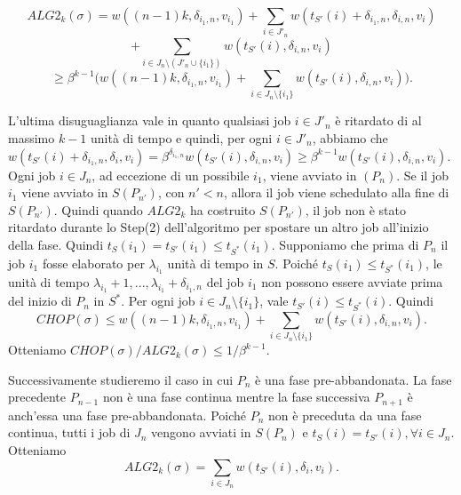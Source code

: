 \documentclass[12pt]{article}
\begin{document}
$$ALG2_{k}(\sigma ) = w((n - 1)k, \delta_{i_{1} ,n}, v_{i_{1}}) + \sum_{i \in J'_{n}} w(t_{S'}(i)+ \delta_{i_{1} ,n}, \delta_{i ,n}, v_{i})$$
$$+ \sum_{i \in J_{n} \setminus (J'_{n} \cup\{i_{1}\})} w(t_{S'}(i), \delta_{i,n},v_{i})$$ 
$$\geq \beta^{k-1}\Bigg( w((n - 1)k, \delta_{i_{1},n}, v_{i_{1}} ) + \sum_{i \in J_{n} \setminus\{i_{1}\}} w(t_{S'}(i),\delta_{i,n}, v_{i})\Bigg).$$

L'ultima disuguaglianza vale in quanto qualsiasi job $i \in J'_{n}$ è ritardato di al massimo $k - 1$ unità di tempo e quindi, per ogni $i \in J'_{n}$, abbiamo che $w(t_{S'}(i) + \delta_{i_{1}, n}, \delta_{i}, v_{i}) = \beta^{\delta_{i_{1},n}} w(t_{S'}(i), \delta_{i, n}, v_{i}) \geq \beta^{k - 1} w (t_{S'}(i), \delta_{i,n}, v_{i})$. Ogni job $i \in J_{n}$, ad eccezione di un possibile $i_{1}$, viene avviato in $ (P_{n})$. Se il job $i_{1}$ viene avviato in $S(P_{n'})$, con $n' < n$, allora il job viene schedulato alla fine di $S(P_{n'})$. Quindi quando $ALG2_{k}$ ha costruito $S(P_{n'})$, il job non è stato ritardato durante lo Step(2) dell'algoritmo per spostare un altro job all'inizio della fase. Quindi $t_{S}(i_{1}) = t_{S'}(i_{1}) \leq t_{S^{*}}(i_{1})$. Supponiamo che prima di $P_{n}$ il job $i_{1}$ fosse elaborato per $\lambda_{i_{1}}$ unità di tempo in $S$. Poiché $t_{S}(i_{1}) \leq t_{S^{*}} (i_{1})$, le unità di tempo $\lambda_{i_{1}} + 1, ... , \lambda_{i_{1}} + \delta_{i_{1},n}$ del job $i_{1}$ non possono essere avviate prima del inizio di $P_{n}$ in $S^{*}$. Per ogni job $i \in J_{n} \setminus \{i_{1}\}$, vale $t_{S'}(i) \leq t_{S^{*}}(i)$. Quindi
$$CHOP(\sigma) \leq w((n - 1)k, \delta_{i_{1},n}, v_{i_{1}}) + \sum_{i \in J_{n} \setminus \{i_{1}\}} w(t_{S'}(i), \delta_{i,n}, v_{i}).$$
Otteniamo $CHOP(\sigma) / ALG2_{k}(\sigma) \leq 1 / \beta^{k - 1}$.

Successivamente studieremo il caso in cui $P_{n}$ è una fase pre-abbandonata. La fase precedente $P_{n - 1}$ non è una fase continua mentre la fase successiva $P_{n+1}$ è anch'essa una fase pre-abbandonata. Poiché $P_{n}$ non è preceduta da una fase continua, tutti i job di $J_{n}$ vengono avviati in $S(P_{n})$ e $t_{S}(i) = t_{S'}(i), \forall i \in J_{n}$. Otteniamo
$$ALG2_{k} (\sigma) = \sum_{i \in J_{n}} w(t_{S'}(i), \delta_{i}, v_{i}).$$
\end{document}
